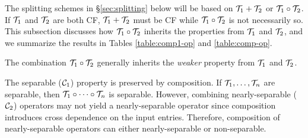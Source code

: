 The splitting schemes in \S\ref{sec:splitting} below will be based on ${\mathcal{T}}_1+{\mathcal{T}}_2$ or ${\mathcal{T}}_1\circ{\mathcal{T}}_2$. If ${\mathcal{T}}_1$ and ${\mathcal{T}}_2$ are both CF, ${\mathcal{T}}_1+{\mathcal{T}}_2$ must be CF while ${\mathcal{T}}_1\circ{\mathcal{T}}_2$ is not necessarily so. This subsection discusses how ${\mathcal{T}}_1\circ{\mathcal{T}}_2$ inherits the properties from ${\mathcal{T}}_1$ and ${\mathcal{T}}_2$, and we summarize the results in Tables \ref{table:comp1-op} and \ref{table:comp-op}.

The combination ${\mathcal{T}}_1\circ {\mathcal{T}}_2$ generally inherits the \emph{weaker} property from ${\mathcal{T}}_1$ and ${\mathcal{T}}_2$. %

The separable (${\mathcal{C}}_1$) property  is  preserved by composition. If ${\mathcal{T}}_1,\ldots,{\mathcal{T}}_n$ are separable, then ${\mathcal{T}}_1\circ\cdots\circ {\mathcal{T}}_n$ is separable.  However, combining  nearly-separable (${\mathcal{C}}_2$) operators  may not yield a nearly-separable operator since composition introduces cross dependence on the input entries. Therefore, composition of nearly-separable operators can either nearly-separable or non-separable.


